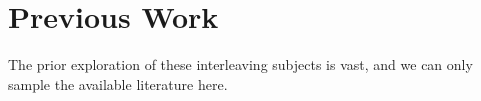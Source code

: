
\section{Previous Work}

The prior exploration of these interleaving subjects is vast, and we can only
sample the available literature here.  